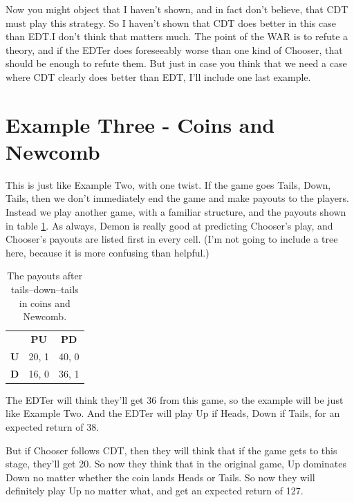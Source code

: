 \documentclass[
  12pt,
]{article}
\begin{document}
Now you might object that I haven't shown, and in fact don't believe, that CDT must play this strategy. So I haven't shown that CDT does better in this case than EDT.I don't think that matters much. The point of the WAR is to refute a theory, and if the EDTer does foreseeably worse than one kind of Chooser, that should be enough to refute them. But just in case you think that we need a case where CDT clearly does better than EDT, I'll include one last example.

\hypertarget{example-three---coins-and-newcomb}{%
\section{Example Three - Coins and Newcomb}\label{example-three---coins-and-newcomb}}

This is just like Example Two, with one twist. If the game goes Tails, Down, Tails, then we don't immediately end the game and make payouts to the players. Instead we play another game, with a familiar structure, and the payouts shown in table \ref{tab:third-anti-war}. As always, Demon is really good at predicting Chooser's play, and Chooser's payouts are listed first in every cell. (I'm not going to include a tree here, because it is more confusing than helpful.)

\renewcommand{\arraystretch}{1.3}   
\begin{table}

\caption{\label{tab:third-anti-war}The payouts after tails–down–tails in coins and Newcomb.}
\centering \vspace{6pt}
\begin{tabular}[t]{>{}r>{}c>{}c}

\textbf{} & \textbf{PU} & \textbf{PD}\\

\textbf{U} & 20, 1 & 40, 0\\
\textbf{D} & 16, 0 & 36, 1\\

\end{tabular}
\end{table}

The EDTer will think they'll get 36 from this game, so the example will be just like Example Two. And the EDTer will play Up if Heads, Down if Tails, for an expected return of 38.

But if Chooser follows CDT, then they will think that if the game gets to this stage, they'll get 20. So now they think that in the original game, Up dominates Down no matter whether the coin lands Heads or Tails. So now they will definitely play Up no matter what, and get an expected return of 127.
\end{document}
